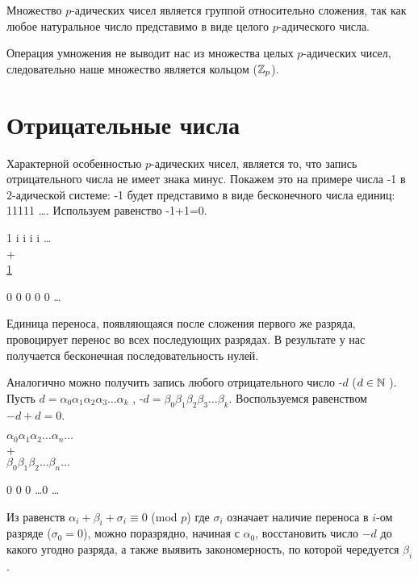 Множество $p$-адических чисел является группой относительно сложения, так как любое натуральное число представимо в виде целого $p$-адического числа.

Операция умножения не выводит нас из множества целых $p$-адических чисел, следовательно наше множество является кольцом ($\mathbb{Z}_p$).

\section{Отрицательные числа} \label{sect1_3}

Характерной особенностью $p$-адических чисел, является то, что запись отрицательного числа не имеет знака минус. Покажем это на примере числа -1 в $2$-адической системе: -1 будет представимо в виде бесконечного числа единиц: 11111 \ldots. Используем равенство -1+1=0. 
\vspace{5mm}

1 i i i i \ldots \\
+ \\

\underline{1\quad\quad\quad\quad}

0 0 0 0 0 \ldots

\vspace{5mm}

Единица переноса, появляющаяся после сложения первого же разряда, провоцирует перенос во всех последующих разрядах. В результате у нас получается бесконечная последовательность нулей. 

Аналогично можно получить запись любого отрицательного число -$d$ ($d \in \mathbb{N}$ ). Пусть $d =  \alpha_0 \alpha_1 \alpha_2 \alpha_3 \ldots \alpha_k$ , -$d = \beta_0 \beta_1 \beta_2 \beta_3 \ldots \beta_k$. Воспользуемся равенством $-d+d=0$. 

\vspace{5mm}

{ $\alpha_0 \alpha_1 \alpha_2 \ldots \alpha_n \ldots$ }\\
+ \\

\underline{$\beta_0 \beta_1 \beta_2 \ldots \beta_n \ldots$}

 0  0  0  \ldots  0 \ldots

\vspace{5mm}

Из равенств $\alpha_i + \beta_i + \sigma_i \equiv 0$ (mod $p$) где $\sigma_i$ означает наличие переноса в $i$-ом разряде ($\sigma_0 = 0$), можно поразрядно, начиная с $\alpha_0$, восстановить число $-d$ до какого угодно разряда, а также выявить закономерность, по которой чередуется $\beta_i$. 

